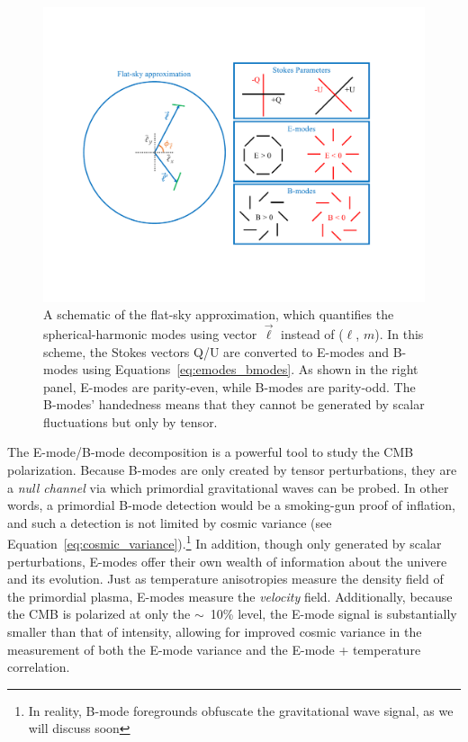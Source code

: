 \begin{figure}[!t]
    \centering
    \includegraphics[width=0.8\linewidth, trim=2.5cm 4cm 3.5cm 4cm, clip]{ScientificMotivation/Figures/emodes_bmodes.pdf}
    \caption[Stokes parameters, E-modes, B-modes in the flat-sky approximation]{A schematic of the flat-sky approximation, which quantifies the spherical-harmonic modes using vector $\vec{\ell}$ instead of ($\ell$, $m$). In this scheme, the Stokes vectors Q/U are converted to E-modes and B-modes using Equations~\ref{eq:emodes_bmodes}. As shown in the right panel, E-modes are parity-even, while B-modes are parity-odd. The B-modes' handedness means that they cannot be generated by scalar fluctuations but only by tensor.}
    \label{fig:emodes_bmodes}
\end{figure}

The E-mode/B-mode decomposition is a powerful tool to study the CMB polarization. Because B-modes are only created by tensor perturbations, they are a \textit{null channel} via which primordial gravitational waves can be probed. In other words, a primordial B-mode detection would be a smoking-gun proof of inflation, and such a detection is not limited by cosmic variance (see Equation~\ref{eq:cosmic_variance}).\footnote{In reality, B-mode foregrounds obfuscate the gravitational wave signal, as we will discuss soon} In addition, though only generated by scalar perturbations, E-modes offer their own wealth of information about the univere and its evolution. Just as temperature anisotropies measure the density field of the primordial plasma, E-modes measure the \textit{velocity} field. Additionally, because the CMB is polarized at only the $\sim$~10\% level, the E-mode signal is substantially smaller than that of intensity, allowing for improved cosmic variance in the measurement of both the E-mode variance and the E-mode + temperature correlation. 


